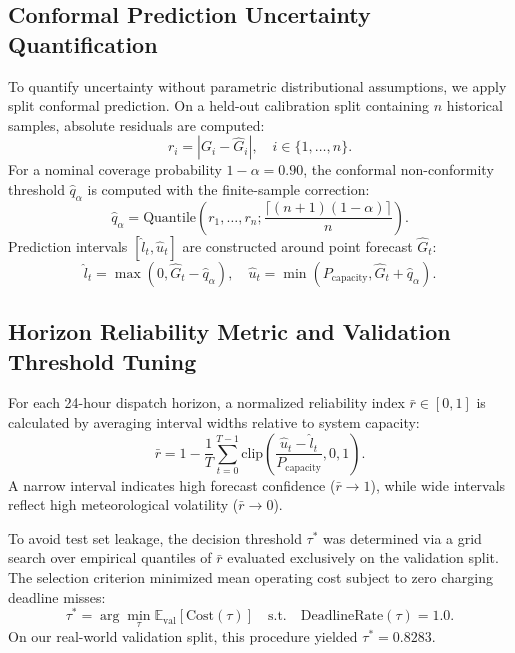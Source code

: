 \documentclass[conference]{IEEEtran}
\begin{document}
\subsection{Conformal Prediction Uncertainty Quantification}
To quantify uncertainty without parametric distributional assumptions, we apply split conformal prediction. On a held-out calibration split containing $n$ historical samples, absolute residuals are computed:
\begin{equation}
r_i = |G_i - \hat{G}_i|, \quad i \in \{1, \dots, n\}.
\end{equation}
For a nominal coverage probability $1-\alpha = 0.90$, the conformal non-conformity threshold $\hat{q}_\alpha$ is computed with the finite-sample correction:
\begin{equation}
\hat{q}_\alpha = \text{Quantile}\left(r_1, \dots, r_n; \frac{\lceil(n+1)(1-\alpha)\rceil}{n}\right).
\end{equation}
Prediction intervals $[\hat{l}_t, \hat{u}_t]$ are constructed around point forecast $\hat{G}_t$:
\begin{equation}
\hat{l}_t = \max(0, \hat{G}_t - \hat{q}_\alpha), \quad \hat{u}_t = \min(P_{\text{capacity}}, \hat{G}_t + \hat{q}_\alpha).
\end{equation}

\subsection{Horizon Reliability Metric and Validation Threshold Tuning}
For each 24-hour dispatch horizon, a normalized reliability index $\bar{r} \in [0, 1]$ is calculated by averaging interval widths relative to system capacity:
\begin{equation}
\bar{r} = 1 - \frac{1}{T}\sum_{t=0}^{T-1} \text{clip}\left(\frac{\hat{u}_t - \hat{l}_t}{P_{\text{capacity}}}, 0, 1\right).
\end{equation}
A narrow interval indicates high forecast confidence ($\bar{r} \to 1$), while wide intervals reflect high meteorological volatility ($\bar{r} \to 0$).

To avoid test set leakage, the decision threshold $\tau^*$ was determined via a grid search over empirical quantiles of $\bar{r}$ evaluated exclusively on the validation split. The selection criterion minimized mean operating cost subject to zero charging deadline misses:
\begin{equation}
\tau^* = \arg\min_{\tau} \mathbb{E}_{\text{val}}[\text{Cost}(\tau)] \quad \text{s.t.} \quad \text{DeadlineRate}(\tau) = 1.0.
\end{equation}
On our real-world validation split, this procedure yielded $\tau^* = 0.8283$.
\end{document}
